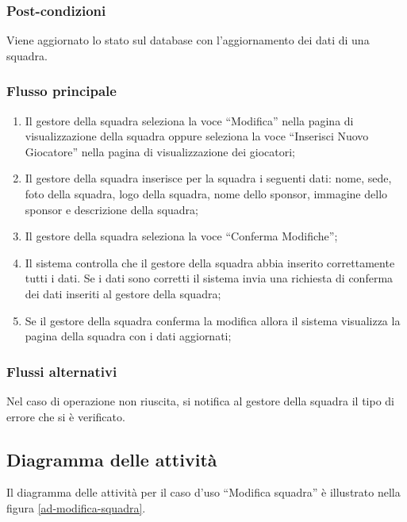 \subsubsection*{Post-condizioni}
Viene aggiornato lo stato sul database con l'aggiornamento dei dati di una squadra.

\subsubsection*{Flusso principale}

\begin{enumerate}
	
	\item
	Il gestore della squadra seleziona la voce ``Modifica'' nella pagina di visualizzazione della squadra oppure seleziona la voce ``Inserisci Nuovo Giocatore'' nella pagina di visualizzazione dei giocatori;
	
	\item
	Il gestore della squadra inserisce per la squadra i seguenti dati: nome, sede, foto della squadra, logo della squadra, nome dello sponsor, immagine dello sponsor e descrizione della squadra;
	
	\item
	Il gestore della squadra seleziona la voce ``Conferma Modifiche'';
	
	\item
	Il sistema controlla che il gestore della squadra abbia inserito correttamente tutti i dati. Se i dati sono corretti il sistema invia una richiesta di conferma dei dati inseriti al gestore della squadra;
	
	\item
	Se il gestore della squadra conferma la modifica allora il sistema visualizza la pagina della squadra con i dati aggiornati;
	
\end{enumerate}

\subsubsection*{Flussi alternativi}
Nel caso di operazione non riuscita, si notifica al gestore della squadra il tipo di errore che si è verificato.

\subsection*{Diagramma delle attività}
Il diagramma delle attività per il caso d'uso ``Modifica squadra'' è illustrato nella figura \vref{ad-modifica-squadra}.


